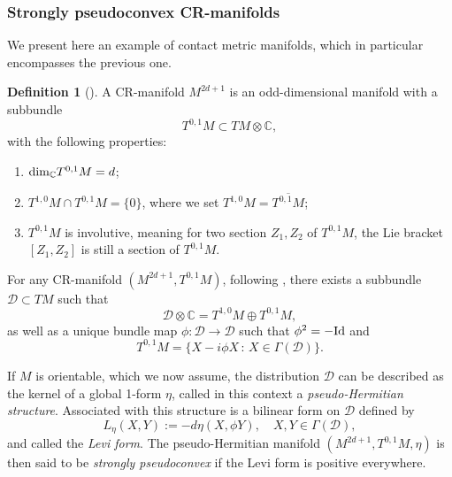 \documentclass[12pt,a4paper]{amsart}
\theoremstyle{plain}
\theoremstyle{definition}
\newtheorem{definition}[theorem]{Definition}
\theoremstyle{remark}
\numberwithin{equation}{section}
\theoremstyle{definition}
\def\C{{\mathbb C}}%
\def \cD{\mathcal{D}}
\numberwithin{equation}{section}
\begin{document}
\subsubsection{Strongly pseudoconvex CR-manifolds}

We present here an example of contact metric manifolds, which in particular encompasses the previous one.

\begin{definition}[\cite{Blair,DT}]
    A CR-manifold $M^{2d+1}$ is an odd-dimensional manifold with a subbundle
    \begin{equation*}
        T^{0,1}M\subset TM\otimes\C,
    \end{equation*}
    with the following properties:
    \begin{enumerate}
        \item[(i)] ${\rm dim}_\C T^{0,1}M = d$;
        \item[(ii)] $T^{1,0}M\cap T^{0,1}M = \{0\}$, where we set $T^{1,0}M = \overline{T^{0,1}M}$;
        \item[(iii)] $T^{0,1}M$ is involutive, meaning for two section $Z_1,Z_2$ of $T^{0,1}M$, the Lie bracket $[Z_1,Z_2]$ is still a section of $T^{0,1}M$.
    \end{enumerate}
\end{definition}

For any CR-manifold $(M^{2d+1},T^{0,1}M)$, following \cite[Section 6.4]{Blair}, there exists a subbundle $\cD\subset TM$ such that
\begin{equation*}
    \cD\otimes \C = T^{1,0}M\oplus T^{0,1}M,
\end{equation*}
as well as a unique bundle map $\phi:\cD\rightarrow\cD$ such that $\phi^2 = -{\rm Id}$ and
\begin{equation*}
    T^{0,1}M = \{X - i\phi X\,:\,X\in\Gamma(\cD)\}.
\end{equation*}

If $M$ is orientable, which we now assume, the distribution $\cD$ can be described as the kernel of a global 1-form $\eta$, called in this context a \emph{pseudo-Hermitian structure}. Associated with this structure is a bilinear form on $\cD$ defined by
\begin{equation*}
    L_\eta(X,Y) := -d\eta(X,\phi Y),\quad X,Y\in\Gamma(\cD),
\end{equation*}
and called the \emph{Levi form}. The pseudo-Hermitian manifold $(M^{2d+1},T^{0,1}M,\eta)$ is then said to be \emph{strongly pseudoconvex} if the Levi form is positive everywhere. 
\end{document}
